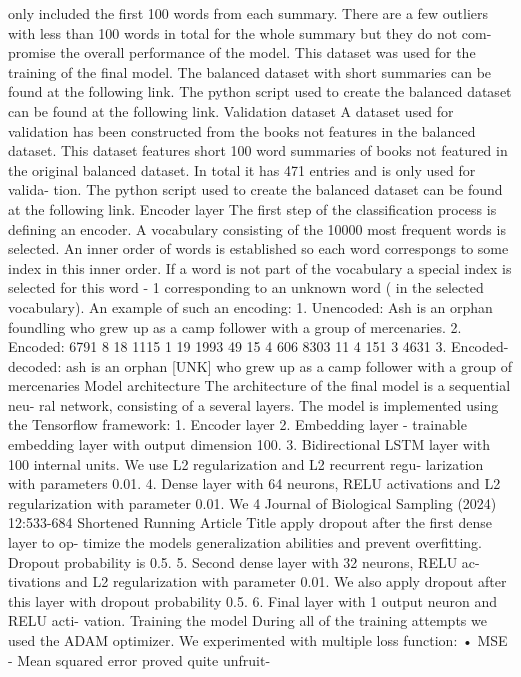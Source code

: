only included the first 100 words from each summary.
There are a few outliers with less than 100 words in
total for the whole summary but they do not com-
promise the overall performance of the model. This
dataset was used for the training of the final model.
The balanced dataset with short summaries can be
found at the following link.
The python script used to create the balanced
dataset can be found at the following link.
Validation dataset
A dataset used for validation has been constructed
from the books not features in the balanced dataset.
This dataset features short 100 word summaries of
books not featured in the original balanced dataset.
In total it has 471 entries and is only used for valida-
tion.
The python script used to create the balanced
dataset can be found at the following link.
Encoder layer
The first step of the classification process is defining
an encoder. A vocabulary consisting of the 10000
most frequent words is selected. An inner order of
words is established so each word correspongs to
some index in this inner order. If a word is not part
of the vocabulary a special index is selected for this
word - 1 corresponding to an unknown word ( in the
selected vocabulary).
An example of such an encoding:
1. Unencoded: Ash is an orphan foundling who
grew up as a camp follower with a group of
mercenaries.
2. Encoded: 6791 8 18 1115 1 19 1993 49 15 4 606
8303 11 4 151 3 4631
3. Encoded-decoded: ash is an orphan [UNK] who
grew up as a camp follower with a group of
mercenaries
Model architecture
The architecture of the final model is a sequential neu-
ral network, consisting of a several layers. The model
is implemented using the Tensorflow framework:
1. Encoder layer
2. Embedding layer - trainable embedding layer
with output dimension 100.
3. Bidirectional LSTM layer with 100 internal units.
We use L2 regularization and L2 recurrent regu-
larization with parameters 0.01.
4. Dense layer with 64 neurons, RELU activations
and L2 regularization with parameter 0.01. We
4 Journal of Biological Sampling (2024) 12:533-684
Shortened Running Article Title
apply dropout after the first dense layer to op-
timize the models generalization abilities and
prevent overfitting. Dropout probability is 0.5.
5. Second dense layer with 32 neurons, RELU ac-
tivations and L2 regularization with parameter
0.01. We also apply dropout after this layer with
dropout probability 0.5.
6. Final layer with 1 output neuron and RELU acti-
vation.
Training the model
During all of the training attempts we used the
ADAM optimizer. We experimented with multiple
loss function:
• MSE - Mean squared error proved quite unfruit-
